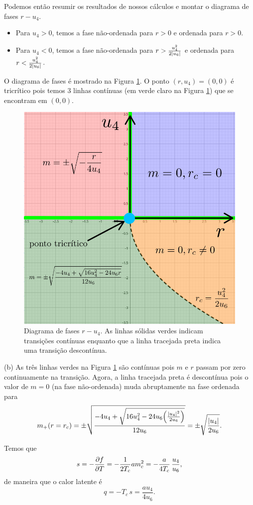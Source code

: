 \documentclass[a4paper,10pt]{article}
\begin{document}
\n

Podemos então resumir os resultados de nossos cálculos e montar o diagrama de fases $r-u_4$.
\begin{itemize}
\item Para $u_4 > 0$, temos a fase não-ordenada para $r > 0$ e ordenada para $r > 0$.
\item Para $u_4 < 0$, temos a fase não-ordenada para $r > \frac{u_4^2}{2 \abs{u_6}}$ e ordenada para $r < \frac{u_4^2}{2 \abs{u_6}}$.
\end{itemize}

O diagrama de fases é mostrado na Figura \ref{fig:phase_diag-tricrit}. O ponto $(r,u_4) = (0,0)$ é tricrítico pois temos 3 linhas contínuas (em verde claro na Figura \ref{fig:phase_diag-tricrit}) que se encontram em $(0,0)$.
\begin{figure}[H]
\centering
\includegraphics[width=0.49\linewidth]{fig/phase_diag-tricrit.png}
\caption{Diagrama de fases $r - u_4$. As linhas sólidas verdes indicam transições contínuas enquanto que a linha tracejada preta indica uma transição descontínua.}
\label{fig:phase_diag-tricrit}
\end{figure}

(b) As três linhas verdes na Figura \ref{fig:phase_diag-tricrit} são contínuas pois $m$ e $r$ passam por zero continuamente na transição. Agora, a linha tracejada preta é descontínua pois o valor de $m = 0$ (na fase não-ordenada) muda abruptamente na fase ordenada para
$$
m_+(r = r_c) = \pm\sqrt{\frac{- 4 u_4 + \sqrt{16 u_4^2 - 24 u_6 \qty(\frac{\abs{u_4}^2}{2 u_6})}}{12 u_6}} = \pm\sqrt{\frac{\abs{u_4}}{2 u_6}}.
$$

\n

Temos que
$$
s = - \pdv{f}{T} = -\frac{1}{2 T_c} a m_c^2 = -\frac{a}{4 T_c} \, \frac{u_4}{u_6},
$$
de maneira que o calor latente é
$$
q = - T_c \, s = \frac{a u_4}{4 u_6}.
$$

\n
\end{document}
